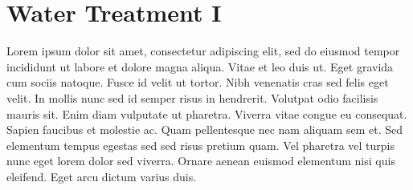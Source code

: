 
\chapter{Water Treatment I}

Lorem ipsum dolor sit amet, consectetur adipiscing elit, sed do eiusmod tempor incididunt ut labore et dolore magna aliqua. Vitae et leo duis ut. Eget gravida cum sociis natoque. Fusce id velit ut tortor. Nibh venenatis cras sed felis eget velit. In mollis nunc sed id semper risus in hendrerit. Volutpat odio facilisis mauris sit. Enim diam vulputate ut pharetra. Viverra vitae congue eu consequat. Sapien faucibus et molestie ac. Quam pellentesque nec nam aliquam sem et. Sed elementum tempus egestas sed sed risus pretium quam. Vel pharetra vel turpis nunc eget lorem dolor sed viverra. Ornare aenean euismod elementum nisi quis eleifend. Eget arcu dictum varius duis.